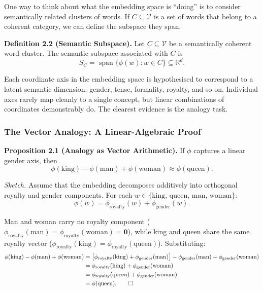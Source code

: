 \documentclass[12pt,a4paper]{article}
\begin{document}
One way to think about what the embedding space is ``doing'' is to consider semantically
related clusters of words. If $C \subseteq \mathcal{V}$ is a set of words that belong to
a coherent category, we can define the subspace they span.

\textbf{Definition 2.2 (Semantic Subspace).} Let $C \subseteq \mathcal{V}$ be a
semantically coherent word cluster. The semantic subspace associated with $C$ is
\begin{equation}
    S_C = \operatorname{span}\{\phi(w) : w \in C\} \subseteq \mathbb{R}^d.
\end{equation}

Each coordinate axis in the embedding space is hypothesised to correspond to a latent
semantic dimension: gender, tense, formality, royalty, and so on. Individual axes rarely
map cleanly to a single concept, but linear combinations of coordinates demonstrably do.
The clearest evidence is the analogy task.

\subsubsection{The Vector Analogy: A Linear-Algebraic Proof}

\textbf{Proposition 2.1 (Analogy as Vector Arithmetic).} If $\phi$ captures a linear
gender axis, then
\begin{equation}
    \phi(\text{king}) - \phi(\text{man}) + \phi(\text{woman}) \approx \phi(\text{queen}).
\end{equation}

\textit{Sketch.} Assume that the embedding decomposes additively into orthogonal royalty and
gender components. For each $w \in \{\text{king, queen, man, woman}\}$:
\begin{equation}
    \phi(w) = \phi_{\text{royalty}}(w) + \phi_{\text{gender}}(w).
\end{equation}

Man and woman carry no royalty component
($\phi_{\text{royalty}}(\text{man}) = \phi_{\text{royalty}}(\text{woman}) = \mathbf{0}$),
while king and queen share the same royalty vector
($\phi_{\text{royalty}}(\text{king}) = \phi_{\text{royalty}}(\text{queen})$). Substituting:
\begin{align}
    \phi(\text{king}) - \phi(\text{man}) + \phi(\text{woman})
    &= \bigl[\phi_{\text{royalty}}(\text{king}) + \phi_{\text{gender}}(\text{man})\bigr]
       - \phi_{\text{gender}}(\text{man})
       + \phi_{\text{gender}}(\text{woman}) \notag \\
    &= \phi_{\text{royalty}}(\text{king}) + \phi_{\text{gender}}(\text{woman}) \notag \\
    &= \phi_{\text{royalty}}(\text{queen}) + \phi_{\text{gender}}(\text{woman}) \notag \\
    &= \phi(\text{queen}). \qed
\end{align}
\end{document}
